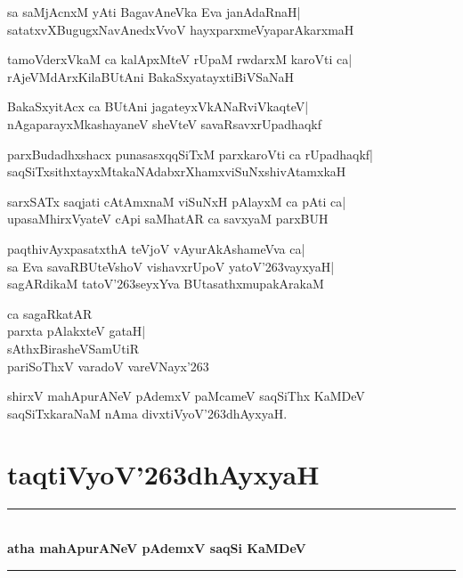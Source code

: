 \documentclass[twoside,12pt,openright]{book}
\def\S{\char'263}
\newcounter{shloka}[chapter]
\begin{document}
\begin{shloka}%
sa saMjAcnxM yAti BagavAneVka Eva janAdaRnaH|\\
satatxvXBugugxNavAnedxVvoV hayxparxmeVyaparAkarxmaH
\end{shloka}

\begin{shloka}%
tamoVderxVkaM ca kalApxMteV rUpaM rwdarxM karoVti ca|\\
rAjeVMdArxKilaBUtAni BakaSxyatayxtiBiVSaNaH
\end{shloka}

\begin{shloka}%
BakaSxyitAcx ca BUtAni jagateyxVkANaRviVkaqteV|\\
nAgaparayxMkashayaneV sheVteV savaRsavxrUpadhaqkf
\end{shloka}

\begin{shloka}%
parxBudadhxshacx punasasxqqSiTxM parxkaroVti ca rUpadhaqkf|\\
saqSiTxsithxtayxMtakaNAdabxrXhamxviSuNxshivAtamxkaH
\end{shloka}

\begin{shloka}%
sarxSATx saqjati cAtAmxnaM viSuNxH pAlayxM ca pAti ca|\\
upasaMhirxVyateV cApi saMhatAR ca savxyaM parxBUH
\end{shloka}

\begin{shloka}%
paqthivAyxpasatxthA teVjoV vAyurAkAshameVva ca|\\
sa Eva savaRBUteVshoV vishavxrUpoV yatoV\S vayxyaH|\\
sagARdikaM tatoV\S seyxYva BUtasathxmupakArakaM
\end{shloka}

\begin{shloka}%
ca sagaRkatAR\\
parxta pAlakxteV gataH|\\
sAthxBirasheVSamUtiR\\
pariSoThxV varadoV vareVNayx\S
\end{shloka}

\begin{center}
shirxV mahApurANeV pAdemxV paMcameV saqSiThx KaMDeV\\
saqSiTxkaraNaM nAma divxtiVyoV\S dhAyxyaH.
\end{center}

\chapter{taqtiVyoV\S dhAyxyaH}
\begin{center}
\rule{2cm}{1pt}\\[.5cm]
{\LARGE\bfseries atha mahApurANeV pAdemxV saqSi KaMDeV}\\[.3cm]
\rule{2cm}{1pt}\\
\end{center}
\end{document}

